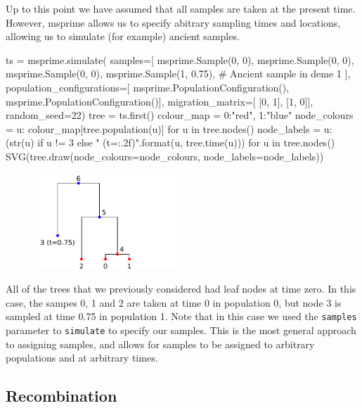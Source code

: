 \documentclass[graybox]{svmult}
\newcommand{\includenbimage}[1]{\begin{center}\texttt{[image: \#1]}\end{center}}
\begin{document}
Up to this point we have assumed that all samples are taken at the
present time. However, msprime allows us to specify abitrary sampling
times and locations, allowing us to simulate (for example) ancient
samples.

\begin{pythoncode}
ts = msprime.simulate(
    samples=[
        msprime.Sample(0, 0), msprime.Sample(0, 0), msprime.Sample(0, 0),
        msprime.Sample(1, 0.75), # Ancient sample in deme 1
    ],
    population_configurations=[
        msprime.PopulationConfiguration(),
        msprime.PopulationConfiguration()],
    migration_matrix=[
        [0, 1],
        [1, 0]],
    random_seed=22)
tree = ts.first()
colour_map = {0:"red", 1:"blue"}
node_colours = {u: colour_map[tree.population(u)] for u in tree.nodes()}
node_labels = {
    u: (str(u) if u != 3 else "{} (t={:.2f})".format(u, tree.time(u)))
    for u in tree.nodes()}
SVG(tree.draw(node_colours=node_colours, node_labels=node_labels))
\end{pythoncode}

\begin{figure}
  \begin{center}
    \includegraphics[width=0.48\textwidth]{images/simulations_45_0}
  \end{center}
\end{figure}

All of the trees that we previously considered had leaf nodes at time
zero. In this case, the sampes 0, 1 and 2 are taken at time 0 in
population 0, but node 3 is sampled at time 0.75 in population 1. Note
that in this case we used the \texttt{samples} parameter to
\texttt{simulate} to specify our samples. This is the most general
approach to assigning samples, and allows for samples to be assigned to
arbitrary populations and at arbitrary times.

\subsection{Recombination}\label{recombination}
\end{document}
